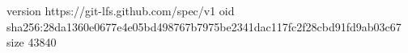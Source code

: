 version https://git-lfs.github.com/spec/v1
oid sha256:28da1360e0677e4e05bd498767b7975be2341dac117fc2f28cbd91fd9ab03c67
size 43840
